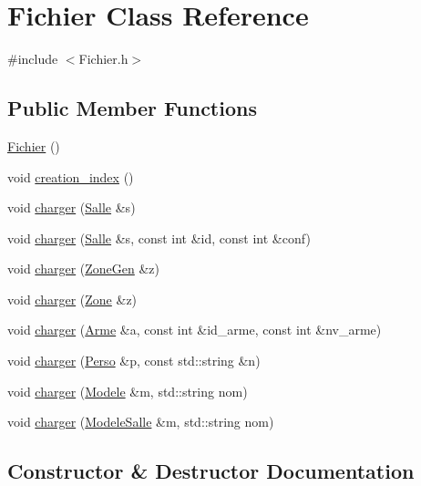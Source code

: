\hypertarget{classFichier}{}\section{Fichier Class Reference}
\label{classFichier}


{\ttfamily \#include $<$Fichier.\+h$>$}

\subsection*{Public Member Functions}
\begin{DoxyCompactItemize}
\item 
\hyperlink{classFichier_ace018349629e9c136aff5421c1e72c4f}{Fichier} ()
\item 
void \hyperlink{classFichier_a8e2a8489a8ffea882d4e0ccbb63b6db5}{creation\+\_\+index} ()
\item 
void \hyperlink{classFichier_a066bf6c08b447e930afdd6f1bd5b36a6}{charger} (\hyperlink{classSalle}{Salle} \&s)
\item 
void \hyperlink{classFichier_a0c22388e17ed0a2915ab81e390612dbc}{charger} (\hyperlink{classSalle}{Salle} \&s, const int \&id, const int \&conf)
\item 
void \hyperlink{classFichier_af8ddba9c428687f989b782ea64d9eeab}{charger} (\hyperlink{classZoneGen}{Zone\+Gen} \&z)
\item 
void \hyperlink{classFichier_a4b61b1529d46332087fd494723cebed9}{charger} (\hyperlink{classZone}{Zone} \&z)
\item 
void \hyperlink{classFichier_a142312981d9a5934e431033450aed3f4}{charger} (\hyperlink{classArme}{Arme} \&a, const int \&id\+\_\+arme, const int \&nv\+\_\+arme)
\item 
void \hyperlink{classFichier_a24944040e870bdd87d5cd2a70dbf44e4}{charger} (\hyperlink{classPerso}{Perso} \&p, const std\+::string \&n)
\item 
void \hyperlink{classFichier_aed5c72a3a8289e51f6724dcd683fbcbd}{charger} (\hyperlink{classModele}{Modele} \&m, std\+::string nom)
\item 
void \hyperlink{classFichier_a5dd17206285977ead14f689d085af32c}{charger} (\hyperlink{classModeleSalle}{Modele\+Salle} \&m, std\+::string nom)
\end{DoxyCompactItemize}


\subsection{Constructor \& Destructor Documentation}
